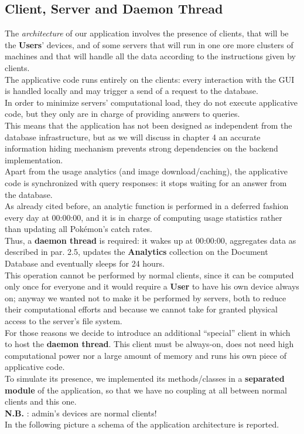 \subsection{Client, Server and Daemon Thread}
The \textit{architecture} of our application involves the presence of clients, that will be the \textbf{Users}’ devices, and of some servers that will run in one ore more clusters of machines and that will handle all the data according to the instructions given by clients.\\
The applicative code runs entirely on the clients: every interaction with the GUI is handled locally and may trigger a send of a request to the database.\\
In order to minimize servers’ computational load, they do not execute applicative code, but they only are in charge of providing answers to queries.\\
This means that the application has not been designed as independent from the database infrastructure, but as we will discuss in chapter 4 an accurate information hiding mechanism prevents strong dependencies on the backend implementation.\\
Apart from the usage analytics (and image download/caching), the applicative code is synchronized with query responses: it stops waiting for an answer from the database. \medskip \\
As already cited before, an analytic function is performed in a deferred fashion every day at 00:00:00, and it is in charge of computing usage statistics rather than updating all Pokémon’s catch rates. \\
Thus, a \textbf{daemon thread} is required: it wakes up at 00:00:00, aggregates data as described in par. 2.5, updates the \textbf{Analytics} collection on the Document Database and eventually sleeps for 24 hours.\\
This operation cannot be performed by normal clients, since it can be computed only once for everyone and it would require a \textbf{User} to have his own device always on; anyway we wanted not to make it be performed by servers, both to reduce their computational efforts and because we cannot take for granted physical access to the server’s file system. \medskip \\

For those reasons we decide to introduce an additional “special” client in which to host the \textbf{daemon thread}. This client must be always-on, does not need high computational power nor a large amount of memory and runs his own piece of applicative code.\\
To simulate its presence, we implemented its methods/classes in a \textbf{separated module} of the application, so that we have no coupling at all between normal clients and this one. \\
\textbf{N.B.} : admin’s devices are normal clients!\\
In the following picture a schema of the application architecture is reported.

